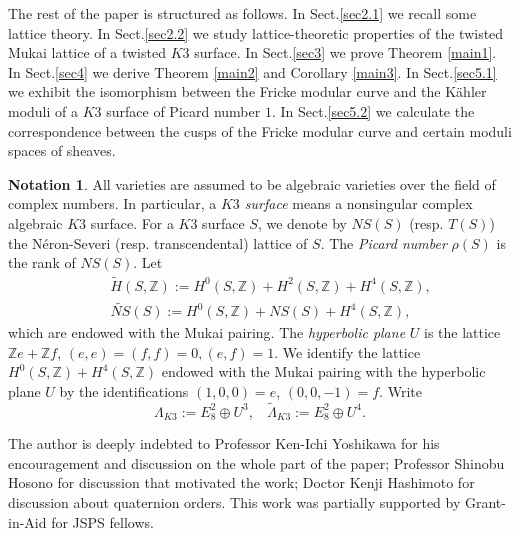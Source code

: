 \documentclass{article}
\theoremstyle{plain}
\theoremstyle{definition}
\newtheorem*{notation*}{Notation}
\theoremstyle{remark}
\newcommand{\Z}{{\mathbb Z}}
\begin{document}
The rest of the paper is structured as follows. 
In Sect.\ref{sec2.1} 
we recall some lattice theory. 
In Sect.\ref{sec2.2} 
we study lattice-theoretic properties of 
the twisted Mukai lattice of a twisted $K3$ surface. 
In Sect.\ref{sec3} 
we prove Theorem \ref{main1}.
In Sect.\ref{sec4} 
we derive Theorem \ref{main2} and Corollary \ref{main3}.
In Sect.\ref{sec5.1} 
we exhibit the isomorphism between 
the Fricke modular curve and the K\"ahler moduli of a $K3$ surface of Picard number $1$.
In Sect.\ref{sec5.2} 
we calculate the correspondence between 
the cusps of the Fricke modular curve and certain moduli spaces of sheaves. 







\begin{notation*}
All varieties are assumed to be algebraic varieties over the field of complex numbers.  
In particular,  
a {\it $K3$ surface\/}   
means a nonsingular complex algebraic $K3$ surface.  
For a $K3$ surface $S$, 
we denote by $NS(S)$ (resp. $T(S)$) 
the N\'eron-Severi (resp. transcendental) lattice 
of $S$. 
The {\it Picard number\/} $\rho (S)$ 
is the rank of $NS(S)$. 
Let 
\begin{eqnarray*}
& & \widetilde{H}(S, {\Z}) 
         := H^{0}(S, {\Z}) + H^{2}(S, {\Z}) + H^{4}(S, {\Z}), \\
& & \widetilde{NS}(S) 
         := H^{0}(S, {\Z}) + NS(S) + H^{4}(S, {\Z}), 
\end{eqnarray*}
which are endowed with the Mukai pairing.  
The {\it hyperbolic plane\/} $U$ 
is the lattice ${\Z}e + {\Z}f$, 
$(e, e) = (f, f) =0, (e, f)=1$. 
We identify the lattice 
$H^{0}(S, {\Z}) + H^{4}(S, {\Z})$ 
endowed with the Mukai pairing 
with the hyperbolic plane 
$U$  
by the identifications  
$(1, 0, 0) = e$, 
$(0, 0, -1) = f$. 
Write 
\begin{equation*}
\Lambda _{K3} := E_{8}^{2} \oplus U^{3},  \: \: \: \: 
\widetilde{\Lambda }_{K3} := E_{8}^{2} \oplus U^{4}. 
\end{equation*}
\end{notation*}





The author is deeply indebted to 
         Professor Ken-Ichi Yoshikawa 
                   for his encouragement and discussion on the whole part of the paper; 
         Professor Shinobu Hosono 
                   for discussion that motivated the work; 
         Doctor Kenji Hashimoto 
                   for discussion about quaternion orders.  
This work was partially supported by Grant-in-Aid for JSPS fellows.                     
\end{document}
